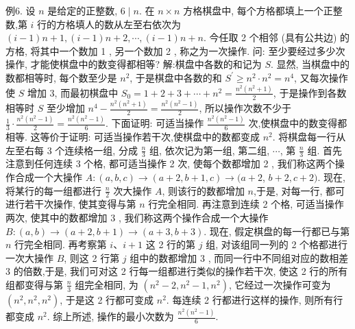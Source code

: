 例6. 设 $n$ 是给定的正整数, $6 \mid n$. 在 $n \times n$ 方格棋盘中, 每个方格都填上一个正整数,第 $i$ 行的方格填人的数从左至右依次为 $(i-1) n+1,(i-1) n+ 2, \cdots,(i-1) n+n$. 今任取 2 个相邻 (具有公共边) 的方格, 将其中一个数加 1 , 另一个数加 2 , 称之为一次操作.
问: 至少要经过多少次操作, 才能使棋盘中的数变得都相等?
解:棋盘中各数的和记为 $S$.
显然, 当棋盘中的数都相等时, 每个数至少是 $n^2$, 于是棋盘中各数的和 $S^{\prime} \geqslant n^2 \cdot n^2=n^4$, 又每次操作使 $S$ 增加 3, 而最初棋盘中 $S_0=1+2+3+\cdots +n^2=\frac{n^2\left(n^2+1\right)}{2}$, 于是操作到各数相等时 $S$ 至少增加 $n^4-\frac{n^2\left(n^2+1\right)}{2}= \frac{n^2\left(n^2-1\right)}{2}$, 所以操作次数不少于 $\frac{1}{3} \cdot \frac{n^2\left(n^2-1\right)}{2}=\frac{n^2\left(n^2-1\right)}{6}$.
下面证明: 可适当操作 $\frac{n^2\left(n^2-1\right)}{6}$ 次,使棋盘中的数变得都相等.
这等价于证明: 可适当操作若干次,使棋盘中的数都变成 $n^2$.
将棋盘每一行从左至右每 3 个连续格一组, 分成 $\frac{n}{3}$ 组, 依次记为第一组, 第二组, $\cdots$, 第 $\frac{n}{3}$ 组.
首先注意到任何连续 3 个格, 都可适当操作 2 次, 使每个数都增加 2 , 我们称这两个操作合成一个大操作 $A:(a, b, c) \rightarrow(a+2, b+1, c) \rightarrow(a+2$, $b+2, c+2)$. 现在, 将某行的每一组都进行 $\frac{n}{2}$ 次大操作 $A$, 则该行的数都增加
$n$,于是, 对每一行, 都可进行若干次操作, 使其变得与第 $n$ 行完全相同.
再注意到连续 2 个格, 可适当操作两次, 使其中的数都增加 3 , 我们称这两个操作合成一个大操作 $B:(a, b) \rightarrow(a+2, b+1) \rightarrow(a+3, b+3)$. 现在, 假定棋盘的每一行都已与第 $n$ 行完全相同.
再考察第 $i 、 i+1$ 这 2 行的第 $j$ 组, 对该组同一列的 2 个格都进行一次大操作 $B$, 则这 2 行第 $j$ 组中的数都增加 3 , 而同一行中不同组对应的数相差 3 的倍数,于是, 我们可对这 2 行每一组都进行类似的操作若干次, 使这 2 行的所有组都变得与第 $\frac{n}{3}$ 组完全相同, 为 $\left(n^2-\right. \left.2, n^2-1, n^2\right)$, 它经过一次操作可变为 $\left(n^2, n^2, n^2\right)$, 于是这 2 行都可变成 $n^2$.
每连续 2 行都进行这样的操作, 则所有行都变成 $n^2$.
综上所述, 操作的最小次数为 $\frac{n^2\left(n^2-1\right)}{6}$.



